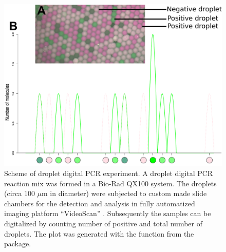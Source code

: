 \begin{figure}[htbp]
  \centering
  \includegraphics[clip=true, width=14cm]{figures/dpcR_sim.pdf}
  \caption{Scheme of droplet digital PCR experiment.  A droplet 
digital PCR reaction mix was formed in a Bio-Rad QX100 system. The droplets 
(circa 100 $\mu$m in diameter) were subjected to custom made slide chambers for 
the detection and analysis in fully automatized imaging platform ``VideoScan'' 
\citep{rodiger_highly_2013}.  Subsequently the samples can be 
digitalized by counting number of positive and total number of droplets. The 
plot was generated with the  function from the  
package.}
\label{figure:dpcR_sim}
\end{figure}

